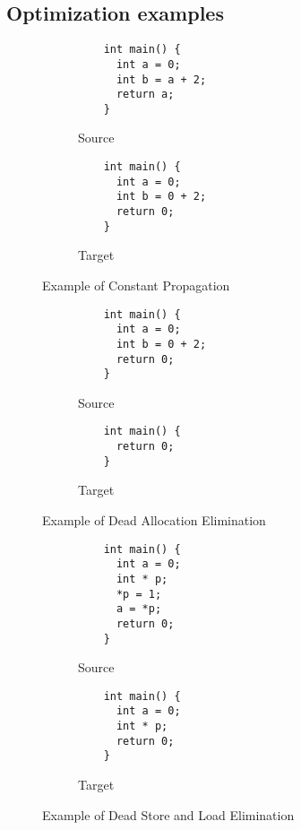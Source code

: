 \subsection{Optimization examples}
\label{subsec:optim}
\begin{figure}[H]
\begin{subfigure}{.48\textwidth}
  \begin{lstlisting}
    int main() {
      int a = 0;
      int b = a + 2;
      return a;
    }
  \end{lstlisting}
  \caption{Source}
  \label{fig:cpbefore}
\end{subfigure}
\begin{subfigure}{.48\textwidth}
  \begin{lstlisting}
    int main() {
      int a = 0;
      int b = 0 + 2;
      return 0;
    }    
  \end{lstlisting}
  \caption{Target}
  \label{fig:cpafter}
\end{subfigure}
\caption{Example of Constant Propagation}
\label{fig:cpexamples}
\end{figure}
\begin{figure}[H]
\begin{subfigure}{.48\textwidth}
  \begin{lstlisting}
    int main() {
      int a = 0;
      int b = 0 + 2;
      return 0;
    }
  \end{lstlisting}
  \caption{Source}
  \label{fig:daebefore}
\end{subfigure}
\begin{subfigure}{.48\textwidth}
  \begin{lstlisting}
    int main() {
      return 0;
    }    
  \end{lstlisting}
  \caption{Target}
  \label{fig:daeafter}
\end{subfigure}
\caption{Example of Dead Allocation Elimination}
\label{fig:daeexamples}
\end{figure}
\begin{figure}[H]
\begin{subfigure}{.48\textwidth}
  \begin{lstlisting}
    int main() {
      int a = 0;
      int * p;
      *p = 1;
      a = *p;
      return 0;
    }
  \end{lstlisting}
  \caption{Source}
  \label{fig:dlsebefore}
\end{subfigure}
\begin{subfigure}{.48\textwidth}
  \begin{lstlisting}
    int main() {
      int a = 0;
      int * p;
      return 0;
    }
  \end{lstlisting}
  \caption{Target}
  \label{fig:dlseafter}
\end{subfigure}
\caption{Example of Dead Store and Load Elimination}
\label{fig:dlseexamples}
\end{figure}
